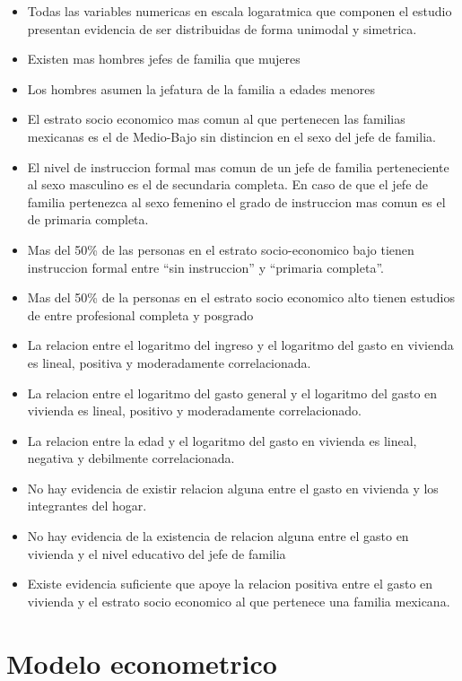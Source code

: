 \documentclass[]{book}
\providecommand{\tightlist}{%
  \setlength{\itemsep}{0pt}\setlength{\parskip}{0pt}}
\begin{document}
\begin{itemize}
\tightlist
\item
  Todas las variables numericas en escala logaratmica que componen el
  estudio presentan evidencia de ser distribuidas de forma unimodal y
  simetrica.
\item
  Existen mas hombres jefes de familia que mujeres
\item
  Los hombres asumen la jefatura de la familia a edades menores
\item
  El estrato socio economico mas comun al que pertenecen las familias
  mexicanas es el de Medio-Bajo sin distincion en el sexo del jefe de
  familia.
\item
  El nivel de instruccion formal mas comun de un jefe de familia
  perteneciente al sexo masculino es el de secundaria completa. En caso
  de que el jefe de familia pertenezca al sexo femenino el grado de
  instruccion mas comun es el de primaria completa.
\item
  Mas del 50\% de las personas en el estrato socio-economico bajo tienen
  instruccion formal entre ``sin instruccion'' y ``primaria completa''.
\item
  Mas del 50\% de la personas en el estrato socio economico alto tienen
  estudios de entre profesional completa y posgrado
\item
  La relacion entre el logaritmo del ingreso y el logaritmo del gasto en
  vivienda es lineal, positiva y moderadamente correlacionada.
\item
  La relacion entre el logaritmo del gasto general y el logaritmo del
  gasto en vivienda es lineal, positivo y moderadamente correlacionado.
\item
  La relacion entre la edad y el logaritmo del gasto en vivienda es
  lineal, negativa y debilmente correlacionada.
\item
  No hay evidencia de existir relacion alguna entre el gasto en vivienda
  y los integrantes del hogar.
\item
  No hay evidencia de la existencia de relacion alguna entre el gasto en
  vivienda y el nivel educativo del jefe de familia
\item
  Existe evidencia suficiente que apoye la relacion positiva entre el
  gasto en vivienda y el estrato socio economico al que pertenece una
  familia mexicana.
\end{itemize}

\chapter{Modelo econometrico}\label{modelo-econometrico}
\end{document}
